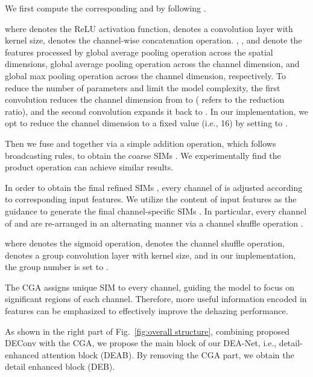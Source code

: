 \documentclass[lettersize,journal]{IEEEtran}
\begin{document}
We first compute the corresponding  and  by following \cite{woo2018ECCV,Hu2018CVPR-SE}.

where  denotes the ReLU activation function,  denotes a convolution layer with  kernel size,  denotes the channel-wise concatenation operation.
, , and  denote the features processed by global average pooling operation across the spatial dimensions, global average pooling operation across the channel dimension, and global max pooling operation across the channel dimension, respectively.
To reduce the number of parameters and limit the model complexity, the first  convolution reduces the channel dimension from  to  ( refers to the reduction ratio), and the second  convolution expands it back to .
In our implementation, we opt to reduce the channel dimension to a fixed value (i.e., 16) by setting  to .


Then we fuse  and  together via a simple addition operation, which follows broadcasting rules, to obtain the coarse SIMs .
We experimentally find the product operation can achieve similar results.


In order to obtain the final refined SIMs , every channel of  is adjusted according to corresponding input features.
We utilize the content of input features as the guidance to generate the final channel-specific SIMs .
In particular, every channel of  and  are re-arranged in an alternating manner via a channel shuffle operation \cite{Zhang2018CVPR-shufflenet}.


where  denotes the sigmoid operation,  denotes the channel shuffle operation,  denotes a group convolution layer with  kernel size, and in our implementation, the group number is set to .

The CGA assigns unique SIM to every channel, guiding the model to focus on significant regions of each channel.
Therefore, more useful information encoded in features can be emphasized to effectively improve the dehazing performance.

As shown in the right part of Fig.~\ref{fig:overall structure},
combining proposed DEConv with the CGA, we propose the main block of our DEA-Net, i.e., detail-enhanced attention block (DEAB).
By removing the CGA part, we obtain the detail enhanced block (DEB).
\end{document}
